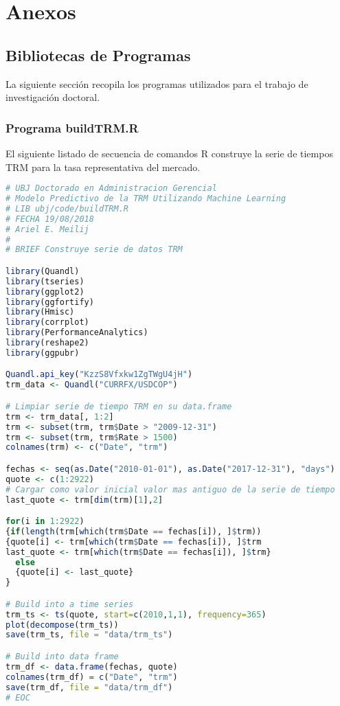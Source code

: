 \setcounter{chapter}{7}
\chapter{Anexos}


\section{Bibliotecas de Programas}
La siguiente sección recopila los programas utilizados para el trabajo de investigación doctoral.

\subsection{Programa buildTRM.R}
El siguiente listado de secuencia de comandos R construye la serie de tiempos TRM para la tasa representativa del mercado.

\begin{lstlisting}[language=R]
# UBJ Doctorado en Administracion Gerencial
# Modelo Predictivo de la TRM Utilizando Machine Learning
# LIB ubj/code/buildTRM.R
# FECHA 19/08/2018
# Ariel E. Meilij
#
# BRIEF Construye serie de datos TRM

library(Quandl)
library(tseries)
library(ggplot2)
library(ggfortify)
library(Hmisc)
library(corrplot)
library(PerformanceAnalytics)
library(reshape2)
library(ggpubr)

Quandl.api_key("KzzS8Vfxkw1ZgTWgU4jH")
trm_data <- Quandl("CURRFX/USDCOP")

# Limpiar serie de tiempo TRM en su data.frame
trm <- trm_data[, 1:2]
trm <- subset(trm, trm$Date > "2009-12-31")
trm <- subset(trm, trm$Rate > 1500)
colnames(trm) <- c("Date", "trm")

fechas <- seq(as.Date("2010-01-01"), as.Date("2017-12-31"), "days")
quote <- c(1:2922)
# Cargar como valor inicial valor mas antiguo de la serie de tiempo
last_quote <- trm[dim(trm)[1],2]

for(i in 1:2922)
{if(length(trm[which(trm$Date == fechas[i]), ]$trm))
{quote[i] <- trm[which(trm$Date == fechas[i]), ]$trm
last_quote <- trm[which(trm$Date == fechas[i]), ]$trm}
  else
  {quote[i] <- last_quote}
}

# Build into a time series
trm_ts <- ts(quote, start=c(2010,1,1), frequency=365)
plot(decompose(trm_ts))
save(trm_ts, file = "data/trm_ts")

# Build into data frame
trm_df <- data.frame(fechas, quote)
colnames(trm_df) = c("Date", "trm")
save(trm_df, file = "data/trm_df")
# EOC
\end{lstlisting}

